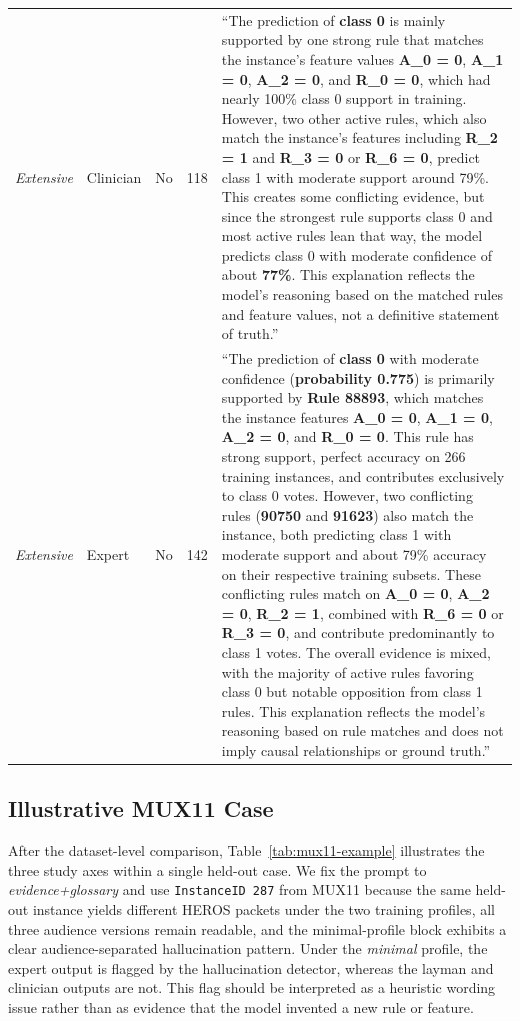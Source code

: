 \documentclass[sigconf]{acmart}
\begin{document}
\begin{table}[t]
{\begin{tabular}{>{\raggedright\arraybackslash}p{1.8cm}>{\raggedright\arraybackslash}p{1.3cm}>{\centering\arraybackslash}p{0.8cm}r >{\raggedright\arraybackslash}p{9.9cm}}
\emph{Extensive} & Clinician & No & 118 & ``The prediction of \textbf{class 0} is mainly supported by one strong rule that matches the instance's feature values \textbf{A\_0 = 0}, \textbf{A\_1 = 0}, \textbf{A\_2 = 0}, and \textbf{R\_0 = 0}, which had nearly 100\% class 0 support in training. However, two other active rules, which also match the instance's features including \textbf{R\_2 = 1} and \textbf{R\_3 = 0} or \textbf{R\_6 = 0}, predict class 1 with moderate support around 79\%. This creates some conflicting evidence, but since the strongest rule supports class 0 and most active rules lean that way, the model predicts class 0 with moderate confidence of about \textbf{77\%}. This explanation reflects the model's reasoning based on the matched rules and feature values, not a definitive statement of truth.'' \\
\emph{Extensive} & Expert & No & 142 & ``The prediction of \textbf{class 0} with moderate confidence (\textbf{probability 0.775}) is primarily supported by \textbf{Rule 88893}, which matches the instance features \textbf{A\_0 = 0}, \textbf{A\_1 = 0}, \textbf{A\_2 = 0}, and \textbf{R\_0 = 0}. This rule has strong support, perfect accuracy on 266 training instances, and contributes exclusively to class 0 votes. However, two conflicting rules (\textbf{90750} and \textbf{91623}) also match the instance, both predicting class 1 with moderate support and about 79\% accuracy on their respective training subsets. These conflicting rules match on \textbf{A\_0 = 0}, \textbf{A\_2 = 0}, \textbf{R\_2 = 1}, combined with \textbf{R\_6 = 0} or \textbf{R\_3 = 0}, and contribute predominantly to class 1 votes. The overall evidence is mixed, with the majority of active rules favoring class 0 but notable opposition from class 1 rules. This explanation reflects the model's reasoning based on rule matches and does not imply causal relationships or ground truth.'' \\
\bottomrule
\end{tabular}
}
\end{table}

\subsection{Illustrative MUX11 Case}
After the dataset-level comparison, Table~\ref{tab:mux11-example} illustrates the three study axes within a single held-out case. We fix the prompt to \emph{evidence+glossary} and use \texttt{InstanceID 287} from MUX11 because the same held-out instance yields different HEROS packets under the two training profiles, all three audience versions remain readable, and the minimal-profile block exhibits a clear audience-separated hallucination pattern. Under the \emph{minimal} profile, the expert output is flagged by the hallucination detector, whereas the layman and clinician outputs are not. This flag should be interpreted as a heuristic wording issue rather than as evidence that the model invented a new rule or feature.
\end{document}
